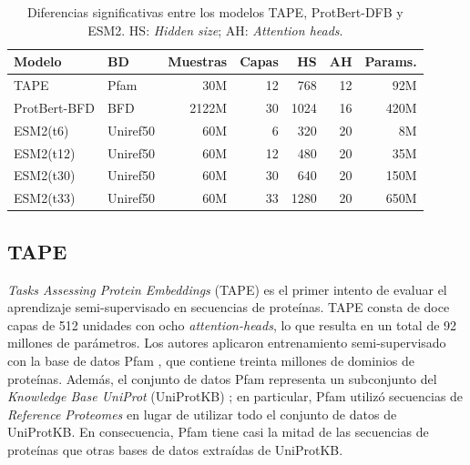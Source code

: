 \begin{table}[t]%
	\centering
	\caption{Diferencias significativas entre los modelos TAPE, ProtBert-DFB y ESM2. HS: \textit{Hidden size}; AH: \textit{Attention heads}.}
	\label{tab:pretrained}%
	\setlength{\tabcolsep}{0.5em} %
	{\renewcommand{\arraystretch}{1.5}%
	\begin{tabular}{llrrrrr}
		
		\textbf{Modelo}   & \textbf{BD} & \textbf{Muestras} & \textbf{Capas} & \textbf{HS} & \textbf{AH} & \textbf{Params.} \\
		\midrule
		TAPE             & Pfam             & 30M                   & 12              & 768                  & 12                       & 92M                 \\
		ProtBert-BFD     & BFD              & 2122M                 & 30              & 1024                 & 16                       & 420M                \\
		ESM2(t6)  & Uniref50         & 60M                   & 6               & 320                  & 20                       & 8M                  \\
		ESM2(t12)  & Uniref50         & 60M                   & 12              & 480                  & 20                       & 35M                 \\
		ESM2(t30) & Uniref50         & 60M                   & 30              & 640                  & 20                       & 150M                \\
		ESM2(t33)  & Uniref50         & 60M                   & 33              & 1280                 & 20                       & 650M               \\
		
	\end{tabular}}
	
\end{table}

\subsection{TAPE}


\textit{Tasks Assessing Protein Embeddings} (TAPE) \citep{rao2019evaluating} es el primer intento de evaluar el aprendizaje semi-supervisado en secuencias de proteínas. TAPE consta de doce capas de 512 unidades con ocho \textit{attention-heads}, lo que resulta en un total de 92 millones de parámetros. Los autores aplicaron entrenamiento semi-supervisado con la base de datos Pfam \citep{el2019pfam}, que contiene treinta millones de dominios de proteínas. Además, el conjunto de datos Pfam representa un subconjunto del \textit{Knowledge Base UniProt} (UniProtKB) \citep{uniprot2018uniprot}; en particular, Pfam utilizó secuencias de \textit{Reference Proteomes} \citep{finn2016pfam} en lugar de utilizar todo el conjunto de datos de UniProtKB. En consecuencia, Pfam tiene casi la mitad de las secuencias de proteínas que otras bases de datos extraídas de UniProtKB.

